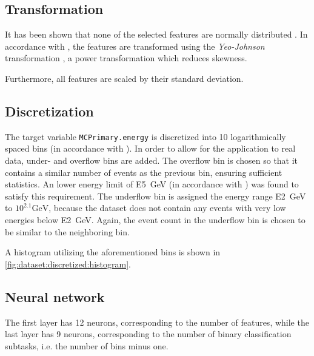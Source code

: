 \subsection{Transformation}
It has been shown that none of the selected features are normally distributed \cite{dsea_jan}.
In accordance with \cite{dsea_jan},
the features are transformed using the \emph{Yeo-Johnson} transformation \cite{yeo_johnson},
a power transformation which reduces skewness.

Furthermore, all features are scaled by their standard deviation.




\subsection{Discretization}
The target variable \texttt{MCPrimary.energy} is discretized into \num{10} logarithmically spaced bins
(in accordance with \cite{dsea_samuel}).
%
In order to allow for the application to real data,
under- and overflow bins are added.
%
The overflow bin is chosen so that it contains a similar number of events as the previous bin,
ensuring sufficient statistics.
An lower energy limit of \SI{E5}{\giga\electronvolt} (in accordance with \cite{dsea_samuel}) was found to satisfy this requirement.
%
The underflow bin is assigned the energy range \SI{E2}{\giga\electronvolt} to $10^{2.1} \si{\giga\electronvolt}$,
because the dataset does not contain any events with very low energies below \SI{E2}{\giga\electronvolt}.
Again, the event count in the underflow bin is chosen to be similar to the neighboring bin.

A histogram utilizing the aforementioned bins is shown in \autoref{fig:dataset:discretized:histogram}.


\subsection{Neural network}
The first layer has \num{12} neurons,
  corresponding to the number of features,
while the last layer has \num{9} neurons,
  corresponding to the number of binary classification subtasks,
    i.e. the number of bins minus one.

